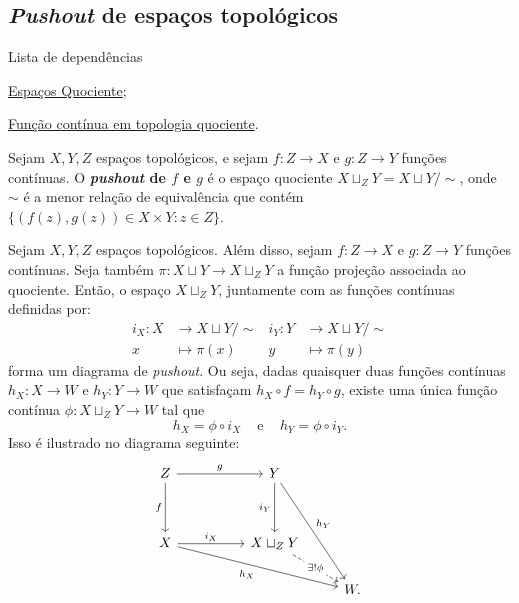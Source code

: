 \subsection{\emph{Pushout} de espaços topológicos} %
\label{pushout-de-espacos-topologicos-def}
\begin{titlemize}{Lista de dependências}
	\item \hyperref[topologia-quociente-def]{Espaços Quociente};\\ %
    \item \hyperref[funcao-continua-em-topologia-quociente-prop]{Função contínua em topologia quociente}.
\end{titlemize}

\begin{defi}
    Sejam $X,Y,Z$ espaços topológicos, e sejam $f:Z\rightarrow X$ e $g:Z\rightarrow Y$ funções contínuas. O \textbf{\emph{pushout} de $f$ e $g$} é o espaço quociente $X\sqcup_Z Y=X\sqcup Y/\sim$, onde $\sim$ é a menor relação de equivalência que contém $\{(f(z),g(z))\in X\times Y:z\in Z\}$. 
\end{defi}

\begin{prop}
    Sejam $X,Y,Z$ espaços topológicos. Além disso, sejam $f:Z\rightarrow X$ e $g:Z\rightarrow Y$ funções contínuas. Seja também $\pi:X\sqcup Y\rightarrow X\sqcup_Z Y$ a função projeção associada ao quociente. Então, o espaço $X\sqcup_Z Y$, juntamente com as funções contínuas definidas por:
    \begin{align*}
        i_X:X &\longrightarrow X\sqcup Y/\sim & i_Y:Y&\longrightarrow X\sqcup Y/\sim\\
        x&\longmapsto \pi(x) & y &\longmapsto \pi(y)
    \end{align*}
    forma um diagrama de \emph{pushout}. Ou seja, dadas quaisquer duas funções contínuas $h_X:X\rightarrow W$ e $h_Y:Y\rightarrow W$ que satisfaçam $h_X\circ f=h_Y\circ g$, existe uma única função contínua 
    $\phi:X\sqcup_Z Y\rightarrow W$ tal que 
    $$h_X=\phi\circ i_X \;\;\;\text{ e }\;\;\; h_Y=\phi\circ i_Y.$$ 
    Isso é ilustrado no diagrama seguinte:
\[\begin{tikzcd}
	Z && Y \\
	\\
	X && {X\sqcup_Z Y} \\
	&&& W.
	\arrow["g", from=1-1, to=1-3]
	\arrow["f"', from=1-1, to=3-1]
	\arrow["{i_Y}"', from=1-3, to=3-3]
	\arrow["{h_Y}", from=1-3, to=4-4]
	\arrow["{i_X}", from=3-1, to=3-3]
	\arrow["{h_X}"', from=3-1, to=4-4]
	\arrow["{\exists! \phi}"{description}, dashed, from=3-3, to=4-4]
\end{tikzcd}\]
\end{prop}

